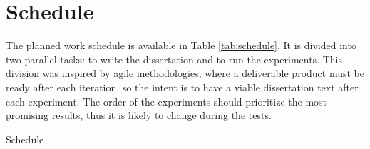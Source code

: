 \section{Schedule}

The planned work schedule is available in Table \ref{tab:schedule}. It is divided into two parallel tasks: to write the dissertation and to run the experiments. This division was inspired by agile methodologies, where a deliverable product must be ready after each iteration, so the intent is to have a viable dissertation text after each experiment. The order of the experiments should prioritize the most promising results, thus it is likely to change during the tests.

\begin{table*}[!ht]
\centering
\caption{Schedule}
\label{tab:schedule}

\newcommand{\xxx}{\cellcolor{black}}


\end{table*}
